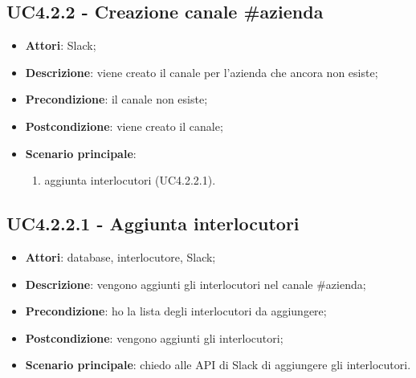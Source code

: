 \documentclass[../AnalisiDeiRequisiti.tex]{subfiles}
\begin{document}
\subsection{UC4.2.2 - Creazione canale \#azienda} 
\label{sssec:UC4.2.2} 
\begin{itemize} 
\item \textbf{Attori}: Slack;
\item \textbf{Descrizione}: viene creato il canale per l'azienda che ancora non esiste;
\item \textbf{Precondizione}: il canale non esiste;
\item \textbf{Postcondizione}: viene creato il canale;
\item \textbf{Scenario principale}: \begin{enumerate}\item aggiunta interlocutori (UC4.2.2.1). 
 \end{enumerate}
\end{itemize} 
\subsection{UC4.2.2.1 - Aggiunta interlocutori} 
\label{sssec:UC4.2.2.1} 
\begin{itemize} 
\item \textbf{Attori}: database, interlocutore, Slack;
\item \textbf{Descrizione}: vengono aggiunti gli interlocutori nel canale \#azienda;
\item \textbf{Precondizione}: ho la lista degli interlocutori da aggiungere;
\item \textbf{Postcondizione}: vengono aggiunti gli interlocutori;
\item \textbf{Scenario principale}: chiedo alle API di Slack di aggiungere gli interlocutori.\end{itemize} 
\newpage
\end{document}
